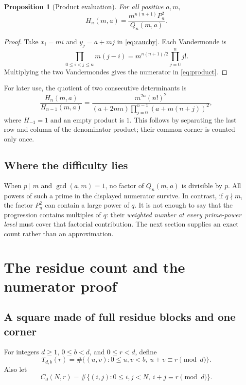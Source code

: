 \documentclass[11pt,a4paper]{article}
\numberwithin{equation}{section}
\newtheorem{proposition}[theorem]{Proposition}
\theoremstyle{definition}
\theoremstyle{remark}
\begin{document}
\begin{proposition}[Product evaluation]\label{prop:product}
For all positive $a,m$,
\begin{equation}\label{eq:product}
 H_n(m,a)=\frac{m^{n(n+1)}P_n^2}{Q_n(m,a)}.
\end{equation}
\end{proposition}
\begin{proof}
Take $x_i=mi$ and $y_j=a+mj$ in \eqref{eq:cauchy}. Each Vandermonde is
\[
 \prod_{0\leq i<j\leq n}m(j-i)
 =m^{n(n+1)/2}\prod_{j=0}^n j!.
\]
Multiplying the two Vandermondes gives the numerator in \eqref{eq:product}.
\end{proof}

For later use, the quotient of two consecutive determinants is
\begin{equation}\label{eq:Hratio}
 \frac{H_n(m,a)}{H_{n-1}(m,a)}
 =\frac{m^{2n}(n!)^2}
 {(a+2mn)\displaystyle\prod_{j=0}^{n-1}(a+m(n+j))^2},
\end{equation}
where $H_{-1}=1$ and an empty product is $1$. This follows by separating the last row and column of the denominator product; their common corner is counted only once.

\subsection{Where the difficulty lies}
When $p\mid m$ and $\gcd(a,m)=1$, no factor of $Q_n(m,a)$ is divisible by $p$. All powers of such a prime in the displayed numerator survive. In contrast, if $q\nmid m$, the factor $P_n^2$ can contain a large power of $q$. It is not enough to say that the progression contains multiples of $q$: their \emph{weighted number at every prime-power level} must cover that factorial contribution. The next section supplies an exact count rather than an approximation.

\section{The residue count and the numerator proof}\label{sec:main}

\subsection{A square made of full residue blocks and one corner}
For integers $d\geq1$, $0\leq b<d$, and $0\leq r<d$, define
\begin{equation}\label{eq:Tdef}
 T_{d,b}(r)=\#\{(u,v):0\leq u,v<b,\ u+v\equiv r\pmod d\}.
\end{equation}
Also let
\[
 C_d(N,r)=\#\{(i,j):0\leq i,j<N,\ i+j\equiv r\pmod d\}.
\]
\end{document}
